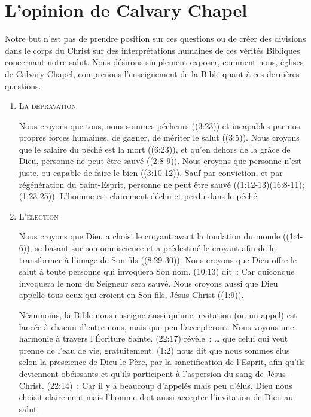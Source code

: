 \section{L'opinion de Calvary Chapel}

Notre but n'est pas de prendre position sur ces questions  ou de créer des divisions dans le corps du Christ sur des interprétations humaines de ces vérités Bibliques concernant notre salut. Nous désirons simplement exposer, comment nous, églises de Calvary Chapel, comprenons l'enseignement de la Bible quant à ces dernières questions.
 
\begin{enumerate}

  \item  \textsc{La dépravation}

Nous croyons que tous, nous sommes pécheurs ((3:23)) et incapables par nos propres forces humaines, de gagner, de mériter le salut ((3:5)).
 Nous croyons que le salaire du péché est la mort ((6:23)), et qu'en dehors de la grâce de Dieu, personne ne peut être sauvé ((2:8-9)).
 Nous croyons que personne n'est juste, ou capable de faire le bien ((3:10-12)).
 Sauf par conviction, et par régénération du Saint-Esprit, personne ne peut être sauvé ((1:12-13)(16:8-11);(1:23-25)).
 L'homme est clairement déchu et perdu dans le péché.


  \item  \textsc{L'élection}

Nous croyons que Dieu a choisi le croyant avant la fondation du monde ((1:4-6)),
 se basant sur  son omniscience et a prédestiné le croyant afin de le transformer
 à l'image de Son fils ((8:29-30)).
 Nous croyons que Dieu offre le salut à toute personne qui invoquera Son nom.
 (10:13) dit~: \og Car quiconque invoquera le nom du Seigneur sera sauvé. \fg{}
 Nous croyons aussi que Dieu appelle tous ceux qui croient en Son fils,
 Jésus-Christ ((1:9)).

Néanmoins, la Bible nous enseigne aussi qu'une invitation (ou un appel)
 est lancée à chacun d'entre nous,
 mais que peu l'accepteront.
 Nous voyons une harmonie à travers l'Écriture Sainte.  (22:17) révèle~:
 \og \dots{} que  celui qui veut prenne de l'eau de vie, gratuitement. \fg{}
 (1:2) nous dit que nous sommes \og élus selon la prescience de Dieu le Père,
 par la sanctification de l'Esprit, afin qu'ils deviennent obéissants et qu'ils participent
 à l'aspersion du sang de Jésus-Christ. \fg{}
 (22:14)~: \og Car il y a beaucoup d'appelés mais peu d'élus. \fg{}
 Dieu nous choisit clairement mais l'homme doit aussi accepter l'invitation de Dieu au salut.


\end{enumerate}
